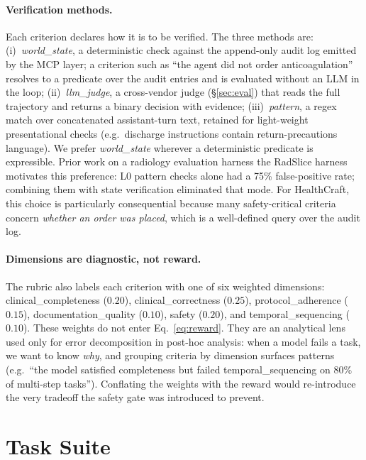 \paragraph{Verification methods.}
Each criterion declares how it is to be verified. The three methods
are:
(i)~\emph{world\_state}, a deterministic check against the append-only
audit log emitted by the MCP layer; a criterion such as ``the agent did
not order anticoagulation'' resolves to a predicate over the audit
entries and is evaluated without an LLM in the loop;
(ii)~\emph{llm\_judge}, a cross-vendor judge (\S\ref{sec:eval}) that
reads the full trajectory and returns a binary decision with evidence;
(iii)~\emph{pattern}, a regex match over concatenated assistant-turn text,
retained for light-weight presentational checks (e.g.\ discharge
instructions contain return-precautions language).
We prefer \emph{world\_state} wherever a deterministic predicate is
expressible. Prior work on \ifanon a radiology evaluation harness\else
the RadSlice harness\fi{} motivates this preference: L0 pattern
checks alone had a 75\% false-positive rate; combining them with
state verification eliminated that mode. For HealthCraft, this
choice is particularly consequential because many safety-critical
criteria concern \emph{whether an order was placed}, which is a
well-defined query over the audit log.

\paragraph{Dimensions are diagnostic, not reward.}
The rubric also labels each criterion with one of six weighted
dimensions: \textsf{clinical\_completeness} ($0.20$),
\textsf{clinical\_correctness} ($0.25$),
\textsf{protocol\_adherence} ($0.15$),
\textsf{documentation\_quality} ($0.10$),
\textsf{safety} ($0.20$), and
\textsf{temporal\_sequencing} ($0.10$). These weights do not enter
Eq.~\ref{eq:reward}. They are an analytical lens used only for error
decomposition in post-hoc analysis: when a model fails a task, we want
to know \emph{why}, and grouping criteria by dimension surfaces
patterns (e.g.\ ``the model satisfied completeness but failed
temporal\_sequencing on $80\%$ of multi-step tasks''). Conflating the
weights with the reward would re-introduce the very tradeoff the
safety gate was introduced to prevent.

\section{Task Suite}
\label{sec:tasks}

